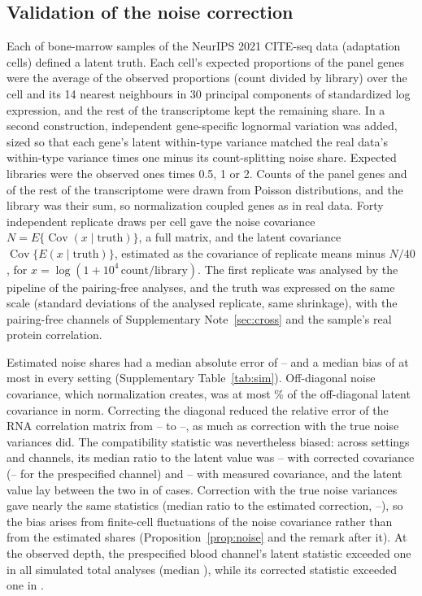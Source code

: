 \subsection*{Validation of the noise correction}
Each of \RcBmSamples{} bone-marrow samples of the NeurIPS 2021 CITE-seq data\cite{luecken2021sandbox} (adaptation cells) defined a
latent truth. Each cell's expected proportions of the panel genes were the
average of the observed proportions (count divided by library) over the cell and
its 14 nearest neighbours in 30 principal components of standardized log
expression, and the rest of the transcriptome kept the remaining share. In a
second construction, independent gene-specific lognormal variation was added,
sized so that each gene's latent within-type variance matched the real data's
within-type variance times one minus its count-splitting noise share. Expected
libraries were the observed ones times 0.5, 1 or 2. Counts of the panel genes and
of the rest of the transcriptome were drawn from Poisson distributions, and the
library was their sum, so normalization coupled genes as in real data. Forty
independent replicate draws per cell gave the noise covariance
$N=E\{\operatorname{Cov}(x\mid\text{truth})\}$, a full matrix, and the latent
covariance $\operatorname{Cov}\{E(x\mid\text{truth})\}$, estimated as the
covariance of replicate means minus $N/40$, for
$x=\log(1+10^4\,\text{count}/\text{library})$. The first replicate was analysed
by the pipeline of the pairing-free analyses, and the truth was expressed on the
same scale (standard deviations of the analysed replicate, same shrinkage), with
the pairing-free channels of Supplementary Note~\ref{sec:cross} and the sample's real protein correlation.

Estimated noise shares had a median absolute error of
\RcSimNuMaeMin--\RcSimNuMaeMax{} and a median bias of at most \RcSimNuBiasMax{} in
every setting (Supplementary Table~\ref{tab:sim}). Off-diagonal noise covariance,
which normalization creates, was at most \RcSimCouplingMax\% of the off-diagonal
latent covariance in norm. Correcting the diagonal reduced the relative error of
the RNA correlation matrix from \RcSimErrMeasMin--\RcSimErrMeasMax{} to
\RcSimErrCorrMin--\RcSimErrCorrMax, as much as correction with the true noise
variances did. The compatibility statistic was nevertheless biased: across
settings and channels, its median ratio to the latent value was
\RcSimCorrRatioMin--\RcSimCorrRatioMax{} with corrected covariance
(\RcSimFrozenRatioMin--\RcSimFrozenRatioMax{} for the prespecified channel) and
\RcSimMeasRatioMin--\RcSimMeasRatioMax{} with measured covariance, and the latent
value lay between the two in \RcSimBracket{} of \RcSimBracketTotal{} cases. Correction
with the true noise variances gave nearly the same statistics (median ratio to
the estimated correction, \RcSimOracleMin--\RcSimOracleMax), so the bias arises
from finite-cell fluctuations of the noise covariance rather than from the
estimated shares (Proposition~\ref{prop:noise} and the remark after it). At the observed
depth, the prespecified blood channel's latent statistic exceeded one in all \RcSimDOne{}
simulated total analyses (median \RcSimFrozenTrue), while its corrected statistic
exceeded one in \RcSimFrozenCorrAbove.

